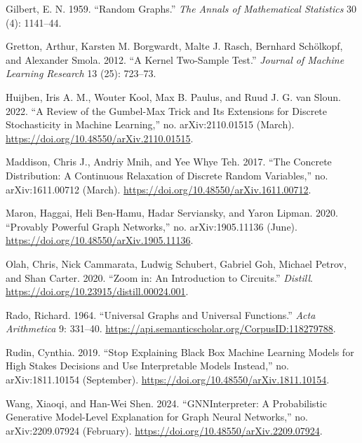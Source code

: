 \documentclass[
  11pt,
  letterpaper,
]{article}
\newlength{\cslhangindent}
\newlength{\cslentryspacingunit} %
\newenvironment{CSLReferences}[2] %
 {%
  \setlength{\parindent}{0pt}
  \ifodd #1
  \let\oldpar\par
  \def\par{\hangindent=\cslhangindent\oldpar}
  \fi
  \setlength{\parskip}{#2\cslentryspacingunit}
 }%
 {}
\begin{document}
\begin{CSLReferences}{1}{0}
\leavevmode{}%
Gilbert, E. N. 1959. {``Random Graphs.''} \emph{The Annals of
Mathematical Statistics} 30 (4): 1141--44.

\leavevmode{}%
Gretton, Arthur, Karsten M. Borgwardt, Malte J. Rasch, Bernhard
Schölkopf, and Alexander Smola. 2012. {``A Kernel Two-Sample Test.''}
\emph{Journal of Machine Learning Research} 13 (25): 723--73.

\leavevmode{}%
Huijben, Iris A. M., Wouter Kool, Max B. Paulus, and Ruud J. G. van
Sloun. 2022. {``A Review of the Gumbel-Max Trick and Its Extensions for
Discrete Stochasticity in Machine Learning,''} no. arXiv:2110.01515
(March). \url{https://doi.org/10.48550/arXiv.2110.01515}.

\leavevmode{}%
Maddison, Chris J., Andriy Mnih, and Yee Whye Teh. 2017. {``The Concrete
Distribution: A Continuous Relaxation of Discrete Random Variables,''}
no. arXiv:1611.00712 (March).
\url{https://doi.org/10.48550/arXiv.1611.00712}.

\leavevmode{}%
Maron, Haggai, Heli Ben-Hamu, Hadar Serviansky, and Yaron Lipman. 2020.
{``Provably Powerful Graph Networks,''} no. arXiv:1905.11136 (June).
\url{https://doi.org/10.48550/arXiv.1905.11136}.

\leavevmode{}%
Olah, Chris, Nick Cammarata, Ludwig Schubert, Gabriel Goh, Michael
Petrov, and Shan Carter. 2020. {``Zoom in: An Introduction to
Circuits.''} \emph{Distill}.
\url{https://doi.org/10.23915/distill.00024.001}.

\leavevmode{}%
Rado, Richard. 1964. {``Universal Graphs and Universal Functions.''}
\emph{Acta Arithmetica} 9: 331--40.
\url{https://api.semanticscholar.org/CorpusID:118279788}.

\leavevmode{}%
Rudin, Cynthia. 2019. {``Stop Explaining Black Box Machine Learning
Models for High Stakes Decisions and Use Interpretable Models
Instead,''} no. arXiv:1811.10154 (September).
\url{https://doi.org/10.48550/arXiv.1811.10154}.

\leavevmode{}%
Wang, Xiaoqi, and Han-Wei Shen. 2024. {``GNNInterpreter: A Probabilistic
Generative Model-Level Explanation for Graph Neural Networks,''} no.
arXiv:2209.07924 (February).
\url{https://doi.org/10.48550/arXiv.2209.07924}.


\end{CSLReferences}
\end{document}
